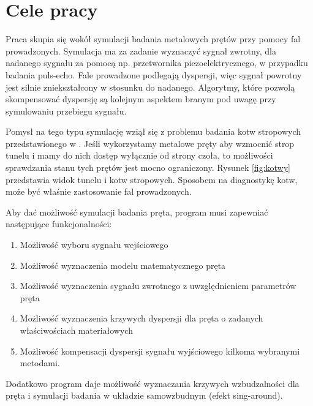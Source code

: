 \section{Cele pracy}
\label{sec:cel}


Praca skupia się wokół symulacji badania metalowych prętów przy pomocy fal prowadzonych. Symulacja ma za zadanie wyznaczyć sygnał zwrotny, dla nadanego sygnału za pomocą np. przetwornika piezoelektrycznego, w przypadku badania puls-echo. Fale prowadzone podlegają dyspersji, więc sygnał powrotny jest silnie zniekształcony w stosunku do nadanego. Algorytmy, które pozwolą skompensować dyspersję są kolejnym aspektem branym pod uwagę przy symulowaniu przebiegu sygnału.

Pomysł na tego typu symulację wziął się z problemu badania kotw stropowych przedstawionego w \cite{kotwy}. Jeśli wykorzystamy metalowe pręty aby wzmocnić strop tunelu i mamy do nich dostęp wyłącznie od strony czoła, to możliwości sprawdzania stanu tych prętów jest mocno ograniczony. Rysunek \ref{fig:kotwy} przedstawia widok tunelu i kotw stropowych. Sposobem na diagnostykę kotw, może być właśnie zastosowanie fal prowadzonych. 

Aby dać możliwość symulacji badania pręta, program musi zapewniać następujące funkcjonalności:
\begin{enumerate}
  \item Możliwość wyboru sygnału wejściowego
  \item Możliwość wyznaczenia modelu matematycznego pręta
  \item Możliwość wyznaczenia sygnału zwrotnego z uwzględnieniem parametrów pręta
  \item Możliwość wyznaczenia krzywych dyspersji dla pręta o zadanych właściwościach materiałowych
  \item Możliwość kompensacji dyspersji sygnału wyjściowego kilkoma wybranymi metodami.
\end{enumerate}

\vspace{5mm}

Dodatkowo program daje możliwość wyznaczania krzywych wzbudzalności dla pręta i symulacji badania w układzie samowzbudnym (efekt sing-around).



















